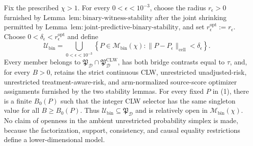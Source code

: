 Fix the prescribed \(\chi>1\). For every \(0<\epsilon<10^{-3}\), choose the radius \(r_\epsilon>0\) furnished by Lemma~\(\mathrm{lem{:}binary\text{-}witness\text{-}stability}\) after the joint shrinking permitted by Lemma~\(\mathrm{lem{:}joint\text{-}predictive\text{-}binary\text{-}stability}\), and set \(r_\epsilon^{\mathrm{opt}}:=r_\epsilon\). Choose \(0<\delta_\epsilon<r_\epsilon^{\mathrm{opt}}\) and define
\[
 \mathcal U_{\mathrm{bin}}
 =\bigcup_{0<\epsilon<10^{-3}}
 \left\{P\in\mathcal M_{\mathrm{bin}}(\chi):
 \|P-P_\epsilon\|_{\mathrm{cell}}<\delta_\epsilon\right\}. \tag{1}
\]
Every member belongs to \(\mathfrak P_{\mathcal D}\cap\mathfrak P_{\mathcal D}^{\mathrm{CLW}}\), has both bridge contrasts equal to \(\tau\), and, for every \(B>0\), retains the strict continuous CLW, unrestricted unadjusted-risk, unrestricted treatment-aware-risk, and arm-normalized source-score optimizer assignments furnished by the two stability lemmas. For every fixed \(P\) in (1), there is a finite \(B_0(P)\) such that the integer CLW selector has the same singleton value for all \(B\ge B_0(P)\). Thus \(\mathcal U_{\mathrm{bin}}\subseteq\mathfrak P_{\mathcal D}\) and is relatively open in \(\mathcal M_{\mathrm{bin}}(\chi)\). No claim of openness in the ambient unrestricted probability simplex is made, because the factorization, support, consistency, and causal equality restrictions define a lower-dimensional model.